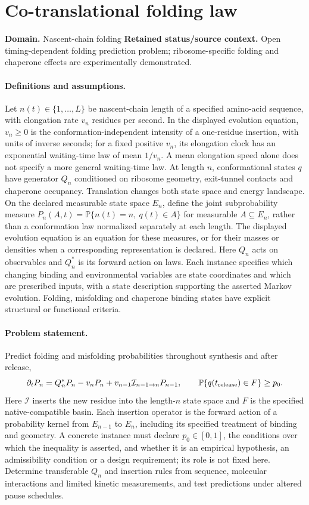 \documentclass[11pt]{article}
\begin{document}
\section*{Co-translational folding law}
\label{prob:097}
\label{rank:73}
\par\smallskip

\noindent\textbf{Domain.} Nascent-chain folding \quad \textbf{Retained status/source context.} Open timing-dependent folding prediction problem; ribosome-specific folding and chaperone effects are experimentally demonstrated.
\paragraph{Definitions and assumptions.} Let $n(t)\in\{1,\ldots,L\}$ be nascent-chain length of a specified amino-acid sequence, with elongation rate $v_n$ residues per second. In the displayed evolution equation, $v_n\ge0$ is the conformation-independent intensity of a one-residue insertion, with units of inverse seconds; for a fixed positive $v_n$, its elongation clock has an exponential waiting-time law of mean $1/v_n$. A mean elongation speed alone does not specify a more general waiting-time law. At length $n$, conformational states $q$ have generator $Q_n$ conditioned on ribosome geometry, exit-tunnel contacts and chaperone occupancy. Translation changes both state space and energy landscape. On the declared measurable state space $E_n$, define the joint subprobability measure $P_n(A,t)=\mathbb P\{n(t)=n,\ q(t)\in A\}$ for measurable $A\subseteq E_n$, rather than a conformation law normalized separately at each length. The displayed evolution equation is an equation for these measures, or for their masses or densities when a corresponding representation is declared. Here $Q_n$ acts on observables and $Q_n^*$ is its forward action on laws. Each instance specifies which changing binding and environmental variables are state coordinates and which are prescribed inputs, with a state description supporting the asserted Markov evolution. Folding, misfolding and chaperone binding states have explicit structural or functional criteria.
\paragraph{Problem statement.} Predict folding and misfolding probabilities throughout synthesis and after release,
\[\partial_tP_n=Q_n^*P_n-v_nP_n+v_{n-1}\mathcal I_{n-1\to n}P_{n-1},\qquad \mathbb{P}\{q(t_{\rm release})\in F\}\ge p_0.\]
Here $\mathcal I$ inserts the new residue into the length-$n$ state space and $F$ is the specified native-compatible basin. Each insertion operator is the forward action of a probability kernel from $E_{n-1}$ to $E_n$, including its specified treatment of binding and geometry. A concrete instance must declare $p_0\in[0,1]$, the conditions over which the inequality is asserted, and whether it is an empirical hypothesis, an admissibility condition or a design requirement; its role is not fixed here. Determine transferable $Q_n$ and insertion rules from sequence, molecular interactions and limited kinetic measurements, and test predictions under altered pause schedules.
\end{document}
